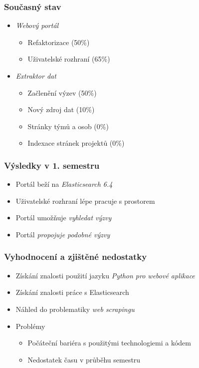 \documentclass[10pt,xcolor=pdflatex]{beamer}
\begin{document}
\begin{frame}
    \frametitle{Současný stav}
    
    \begin{itemize}
        \item \emph{Webový portál}
        \begin{itemize}
            \item Refaktorizace (50\%)
            \item Uživatelské rozhraní (65\%)
	    \end{itemize}    
	    
	   \item \emph{Extraktor dat}
        \begin{itemize}
            \item Začlenění výzev (50\%)
            \item Nový zdroj dat (10\%)
            \item Stránky týmů a osob (0\%)
            \item Indexace stránek projektů (0\%)
	    \end{itemize}    
	\end{itemize}    
\end{frame}


\begin{frame}
    \frametitle{Výsledky v 1. semestru}
    
    \begin{itemize}
        \item Portál beží na \emph{Elasticsearch 6.4}
        \item Uživatelské rozhraní lépe pracuje s prostorem
        \item Portál umožňuje \emph{vyhledat výzvy}
        \item Portál \emph{propojuje podobné výzvy}
    \end{itemize}    
\end{frame}


\begin{frame}
    \frametitle{Vyhodnocení a zjištěné nedostatky}
    
    \begin{itemize}
        \item Získání znalosti použití jazyku \emph{Python pro webové aplikace}
        \item Získání znalosti práce s Elasticsearch
        \item Náhled do problematiky \emph{web scrapingu}
        
        \item Problémy
        \begin{itemize}
            \item Počáteční bariéra s použitými technologiemi a kódem
            \item Nedostatek času v průběhu semestru
        \end{itemize} 
        
    \end{itemize}    
\end{frame}
\end{document}
